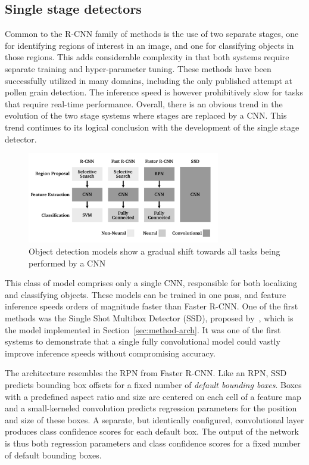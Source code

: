 \subsection{Single stage detectors}\label{sec:ssd}
Common to the R-CNN family of methods is the use of two separate stages, one for identifying regions of interest in an image, and one for classifying objects in those regions.
This adds considerable complexity in that both systems require separate training and hyper-parameter tuning.
These methods have been successfully utilized in many domains, including the only published attempt at pollen grain detection.
The inference speed is however prohibitively slow for tasks that require real-time performance.
Overall, there is an obvious trend in the evolution of the two stage systems where stages are replaced by a CNN\@.
This trend continues to its logical conclusion with the development of the single stage detector.

\begin{figure}[htbp]
    \centering
    \includegraphics[width=0.75\textwidth]{figs/related/detector_evolution.pdf}
    \caption[Evolution of object detection models]{Object detection models show a gradual shift towards all tasks being performed by a CNN}\label{fig:related-detectors}
  \end{figure}

This class of model comprises only a single CNN, responsible for both localizing and classifying objects.
These models can be trained in one pass, and feature inference speeds orders of magnitude faster than Faster R-CNN\@.
One of the first methods was the Single Shot Multibox Detector (SSD), proposed by\ \textcite{liu_ssd_2016}, which is the model implemented in Section~\ref{sec:method-arch}.
It was one of the first systems to demonstrate that a single fully convolutional model could vastly improve inference speeds without compromising accuracy.

The architecture resembles the RPN from Faster R-CNN\@.
Like an RPN, SSD predicts bounding box offsets for a fixed number of \textit{default bounding boxes}.
Boxes with a predefined aspect ratio and size are centered on each cell of a feature map and a small-kerneled convolution predicts regression parameters for the position and size of these boxes.
A separate, but identically configured, convolutional layer produces class confidence scores for each default box.
The output of the network is thus both regression parameters and class confidence scores for a fixed number of default bounding boxes.

